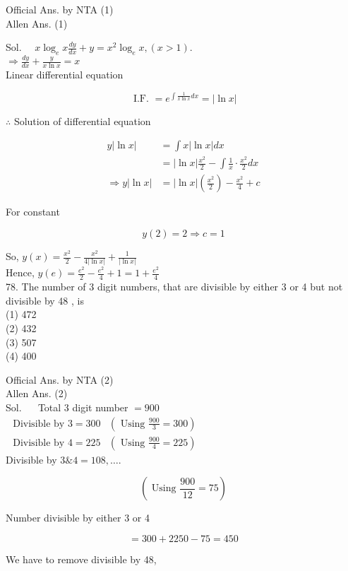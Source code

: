 \documentclass[10pt]{article}
\begin{document}
Official Ans. by NTA (1)\\
Allen Ans. (1)

Sol. \(\quad x \log _{e} x \frac{d y}{d x}+y=x^{2} \log _{e} x,(x>1)\).\\
\(\Rightarrow \frac{d y}{d x}+\frac{y}{x \ln x}=x\)\\
Linear differential equation

\[
\text { I.F. }=e^{\int \frac{1}{x \ln x} d x}=|\ln x|
\]

\(\therefore\) Solution of differential equation

\[
\begin{aligned}
y|\ln x| & =\int x|\ln x| d x \\
& =|\ln x| \frac{x^{2}}{2}-\int \frac{1}{x} \cdot \frac{x^{2}}{2} d x \\
\Rightarrow y|\ln x| & =|\ln x|\left(\frac{x^{2}}{2}\right)-\frac{x^{2}}{4}+c
\end{aligned}
\]

For constant

\[
y(2)=2 \Rightarrow c=1
\]

So, \(y(x)=\frac{x^{2}}{2}-\frac{x^{2}}{4|\ln x|}+\frac{1}{|\ln x|}\)\\
Hence, \(y(e)=\frac{e^{2}}{2}-\frac{e^{2}}{4}+1=1+\frac{e^{2}}{4}\)\\
78. The number of 3 digit numbers, that are divisible by either 3 or 4 but not divisible by 48 , is\\
(1) 472\\
(2) 432\\
(3) 507\\
(4) 400

Official Ans. by NTA (2)\\
Allen Ans. (2)\\
Sol. \(\quad\) Total 3 digit number \(=900\)\\
\(\begin{array}{ll}\text { Divisible by } 3=300 & \left(\text { Using } \frac{900}{3}=300\right) \\ \text { Divisible by } 4=225 & \left(\text { Using } \frac{900}{4}=225\right)\end{array}\)\\
Divisible by \(3 \& 4=108, \ldots\).

\[
\left(\text { Using } \frac{900}{12}=75\right)
\]

Number divisible by either 3 or 4

\[
=300+2250-75=450
\]

We have to remove divisible by 48,
\end{document}
